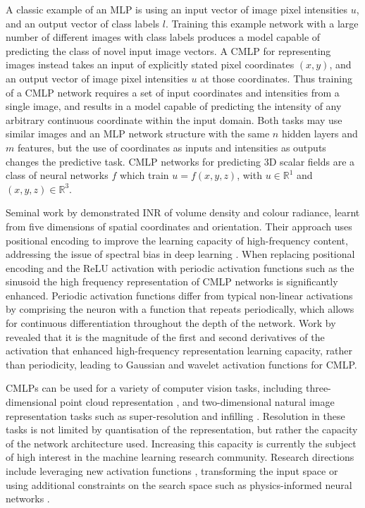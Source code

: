 \documentclass[manuscript.tex]{subfiles}
\begin{document}
A classic example of an MLP is using an input vector of image pixel intensities \(u\), and an output vector of class labels \(l\).
Training this example network with a large number of different images with class labels produces a model capable of predicting the class of novel input image vectors.
A CMLP for representing images instead takes an input of explicitly stated pixel coordinates \((x,y)\), and an output vector of image pixel intensities \(u\) at those coordinates.
Thus training of a CMLP network requires a set of input coordinates and intensities from a single image, and results in a model capable of predicting the intensity of any arbitrary continuous coordinate within the input domain.
Both tasks may use similar images and an MLP network structure with the same \(n\) hidden layers and \(m\) features, but the use of coordinates as inputs and intensities as outputs changes the predictive task.
CMLP networks for predicting 3D scalar fields are a class of neural networks \(f\) which train \(u = f(x,y,z)\), with \(u\in\mathbb{R}^1\) and \((x,y,z)\in\mathbb{R}^3\).

Seminal work by \cite{mildenhallNeRFRepresentingScenes2020} demonstrated INR of volume density and colour radiance, learnt from five dimensions of spatial coordinates and orientation.
Their approach uses positional encoding to improve the learning capacity of high-frequency content, addressing the issue of spectral bias in deep learning \parencite{rahamanSpectralBiasNeural2019}.
When replacing positional encoding and the ReLU activation with periodic activation functions such as the sinusoid \parencite{sitzmann2019siren} the high frequency representation of CMLP networks is significantly enhanced.
Periodic activation functions differ from typical non-linear activations by comprising the neuron with a function that repeats periodically, which allows for continuous differentiation throughout the depth of the network.
Work by \cite{ramasinghePeriodicityUnifyingFramework2022} revealed that it is the magnitude of the first and second derivatives of the activation that enhanced high-frequency representation learning capacity, rather than periodicity, leading to Gaussian \parencite{ramasinghePeriodicityUnifyingFramework2022} and wavelet \parencite{saragadamWIREWaveletImplicit2023} activation functions for CMLP\@.

CMLPs can be used for a variety of computer vision tasks, including three-dimensional point cloud representation \parencite{qiPointNetDeepHierarchical2017}, and two-dimensional natural image representation tasks such as super-resolution and infilling \parencite{leeLocalTextureEstimator2022, chenLearningContinuousImage2021}.
Resolution in these tasks is not limited by quantisation of the representation, but rather the capacity of the network architecture used.
Increasing this capacity is currently the subject of high interest in the machine learning research community.
Research directions include leveraging new activation functions \parencite{saragadamWIREWaveletImplicit2023}, transforming the input space \parencite[e.g.][]{benbarkaSeeingImplicitNeural2022} or using additional constraints on the search space such as physics-informed neural networks \parencite{raissiPhysicsinformedNeuralNetworks2019}.
\end{document}
